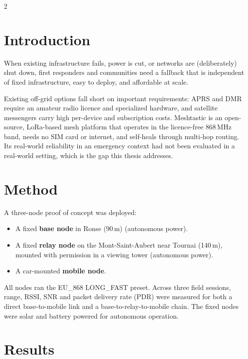 \documentclass[a0,portrait]{hogent-poster}
\begin{document}
\begin{multicols}{2} %

\section{Introduction}
 
When existing infrastructure fails, power is cut, or networks are (deliberately) shut down, first responders and communities need a fallback that is independent of fixed infrastructure, easy to deploy, and affordable at scale.
 
Existing off-grid options fall short on important requirements: APRS and DMR require an amateur radio licence and specialized hardware, and satellite messengers carry high per-device and subscription costs.
Meshtastic is an open-source, LoRa-based mesh platform that operates in the licence-free 868\,MHz band, needs no SIM card or internet, and self-heals through multi-hop routing.
Its real-world reliability in an emergency context had not been evaluated in a real-world setting, which is the gap this thesis addresses.

\section{Method}
 
A three-node proof of concept was deployed:
 
\begin{itemize}
  \item A fixed \textbf{base node} in Ronse (90\,m) (autonomous power).
  \item A fixed \textbf{relay node} on the Mont-Saint-Aubert near Tournai (140\,m), mounted with permission in a viewing tower (autonomous power).
  \item A car-mounted \textbf{mobile node}.
\end{itemize}
 
All nodes ran the EU\_868 LONG\_FAST preset. Across three field sessions, range, RSSI, SNR and packet delivery rate (PDR) were measured for both a direct base-to-mobile link and a base-to-relay-to-mobile chain.
The fixed nodes were solar and battery powered for autonomous operation.

\section{Results}
 

\end{multicols}
\end{document}
